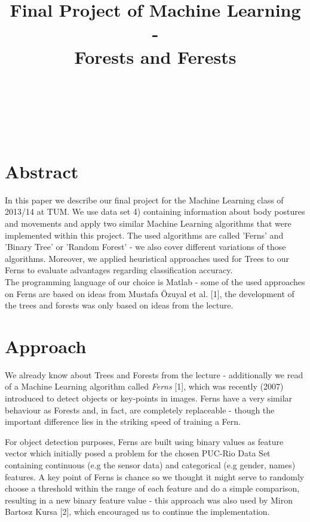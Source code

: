 \documentclass[twocolumn]{article}
\title{Final Project of Machine Learning\\-\\Forests and Ferests}
\author{
\name{Jonas Uhrig}\\
\imat{03616049}\\
\email{jonas.uhrig@in.tum.de}
\And
\name{Michael Wolfram} \\
\imat{03616011}\\
\email{michaelwolfram@gmx.de}
}
\begin{document}
\onecolumn
\maketitle

\section*{Abstract}

In this paper we describe our final project for the Machine Learning class of 2013/14 at TUM. We use data set 4) containing information about body postures and movements and apply two similar Machine Learning algorithms that were implemented within this project. The used algorithms are called 'Ferns' and 'Binary Tree' or 'Random Forest' - we also cover different variations of those algorithms. Moreover, we applied heuristical approaches used for Trees to our Ferns to evaluate advantages regarding classification accuracy.\\
The programming language of our choice is Matlab - some of the used approaches on Ferns are based on ideas from Mustafa \"Ozuyal et al. [1], the development of the trees and forests was only based on ideas from the lecture.



\twocolumn

\section{Approach}
We already know about Trees and Forests from the lecture - additionally we read of a Machine Learning algorithm called \textit{Ferns} [1], which was recently (2007) introduced to detect objects or key-points in images. Ferns have a very similar behaviour as Forests and, in fact, are completely replaceable - though the important difference lies in the striking speed of training a Fern. 

For object detection purposes, Ferns are built using binary values as feature vector which initially posed a problem for the chosen PUC-Rio Data Set containing continuous (e.g the sensor data) and categorical (e.g gender, names) features. A key point of Ferns is chance so we thought it might serve to randomly choose a threshold within the range of each feature and do a simple comparison, resulting in a new binary feature value - this approach was also used by Miron Bartosz Kursa [2], which encouraged us to continue the implementation.
\end{document}
